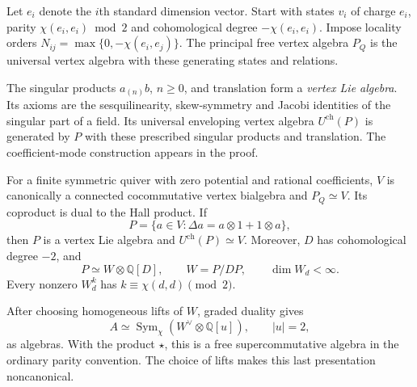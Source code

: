 Let $e_i$ denote the $i$th standard dimension vector.
Start with states $v_i$ of charge $e_i$, parity
$\chi(e_i,e_i)\bmod2$ and cohomological degree $-\chi(e_i,e_i)$.
Impose locality orders $N_{ij}=\max\{0,-\chi(e_i,e_j)\}$.
The principal free vertex algebra $P_Q$ is the universal vertex
algebra with these generating states and relations.


The singular products $a_{(n)}b$, $n\geq0$, and translation
form a \emph{vertex Lie algebra}. Its axioms are the sesquilinearity,
skew-symmetry and Jacobi identities of the singular part of a field.
Its universal enveloping vertex algebra $U^{\mathrm{ch}}(P)$
is generated by $P$ with these prescribed singular products and
translation. The coefficient-mode construction appears in the proof.

\begin{theorem}
\label{v4-arith:hall:thm:vertex-envelope}
For a finite symmetric quiver with zero potential and rational
coefficients, $V$ is canonically a connected cocommutative vertex
bialgebra and $P_Q\simeq V$. Its coproduct is dual to the Hall
product. If
\[
 P=\{a\in V:\Delta a=a\otimes1+1\otimes a\},
\]
then $P$ is a vertex Lie algebra and
$U^{\mathrm{ch}}(P)\simeq V$. Moreover, $D$ has cohomological
degree $-2$, and
\[
 P\simeq W\otimes\mathbb Q[D],\qquad W=P/DP,
 \qquad \dim W_d<\infty.
\]
Every nonzero $W_d^k$ has $k\equiv\chi(d,d)\pmod2$.

After choosing homogeneous lifts of $W$, graded duality gives
\begin{equation}\label{v4-arith:hall:eq:free-coha}
 A\simeq\operatorname{Sym}_{\chi}
                  (W^\vee\otimes\mathbb Q[u]),\qquad |u|=2,
\end{equation}
as algebras. With the product $\star$, this is a free
supercommutative algebra in the ordinary parity convention.
The choice of lifts makes this last presentation noncanonical.
\end{theorem}
